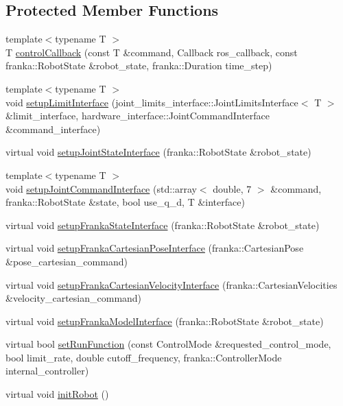 \subsection*{Protected Member Functions}
\begin{DoxyCompactItemize}
\item 
{\footnotesize template$<$typename T $>$ }\\T \hyperlink{classfranka__hw_1_1_franka_h_w_a4014fbce5bae60ee693505775ecee499}{control\+Callback} (const T \&command, Callback ros\+\_\+callback, const franka\+::\+Robot\+State \&robot\+\_\+state, franka\+::\+Duration time\+\_\+step)
\item 
{\footnotesize template$<$typename T $>$ }\\void \hyperlink{classfranka__hw_1_1_franka_h_w_a3a476a1de741f79695f0b64d2580e6cf}{setup\+Limit\+Interface} (joint\+\_\+limits\+\_\+interface\+::\+Joint\+Limits\+Interface$<$ T $>$ \&limit\+\_\+interface, hardware\+\_\+interface\+::\+Joint\+Command\+Interface \&command\+\_\+interface)
\item 
virtual void \hyperlink{classfranka__hw_1_1_franka_h_w_ab216faba5316b7ca1680e9af5d313216}{setup\+Joint\+State\+Interface} (franka\+::\+Robot\+State \&robot\+\_\+state)
\item 
{\footnotesize template$<$typename T $>$ }\\void \hyperlink{classfranka__hw_1_1_franka_h_w_a34e707d6e834267f1ad256da5cce0713}{setup\+Joint\+Command\+Interface} (std\+::array$<$ double, 7 $>$ \&command, franka\+::\+Robot\+State \&state, bool use\+\_\+q\+\_\+d, T \&interface)
\item 
virtual void \hyperlink{classfranka__hw_1_1_franka_h_w_a4dbc96ed57e3054db31bbab11a61afec}{setup\+Franka\+State\+Interface} (franka\+::\+Robot\+State \&robot\+\_\+state)
\item 
virtual void \hyperlink{classfranka__hw_1_1_franka_h_w_a16128e9789d933e1fcb3f9fc6e336eb1}{setup\+Franka\+Cartesian\+Pose\+Interface} (franka\+::\+Cartesian\+Pose \&pose\+\_\+cartesian\+\_\+command)
\item 
virtual void \hyperlink{classfranka__hw_1_1_franka_h_w_a60e7f8225648735e054d8b022efee557}{setup\+Franka\+Cartesian\+Velocity\+Interface} (franka\+::\+Cartesian\+Velocities \&velocity\+\_\+cartesian\+\_\+command)
\item 
virtual void \hyperlink{classfranka__hw_1_1_franka_h_w_a4d738b3573b7ab159209b7e2e0d4a802}{setup\+Franka\+Model\+Interface} (franka\+::\+Robot\+State \&robot\+\_\+state)
\item 
virtual bool \hyperlink{classfranka__hw_1_1_franka_h_w_a910bb11c6a3b14f027ad56dcf0d983c7}{set\+Run\+Function} (const Control\+Mode \&requested\+\_\+control\+\_\+mode, bool limit\+\_\+rate, double cutoff\+\_\+frequency, franka\+::\+Controller\+Mode internal\+\_\+controller)
\item 
virtual void \hyperlink{classfranka__hw_1_1_franka_h_w_ad211498ff17ff1dfb9609a2fcf76d14a}{init\+Robot} ()
\end{DoxyCompactItemize}
